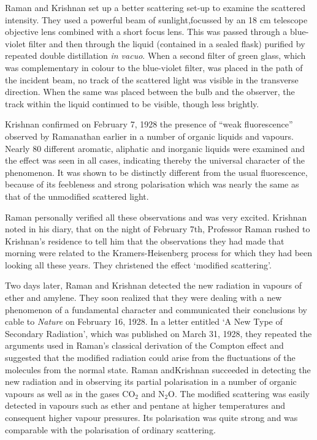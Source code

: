 Raman and Krishnan set up a better scattering set-up to
examine the scattered intensity. They used a powerful beam of
sunlight,\break focussed by an 18 cm telescope objective lens combined
with a short focus lens. This was passed through a blue-violet
filter and then through the liquid (contained in a sealed flask)
purified by repeated double distillation {\em in vacuo}. When a second
filter of green glass, which was complementary in colour to the
blue-violet filter, was placed in the path of the incident beam,
no track of the scattered light was visible in the transverse
direction. When the same was placed between the bulb and the
observer, the track within the liquid continued to be visible,
though less brightly.



Krishnan confirmed on February 7, 1928 the presence of
``weak fluorescence'' observed by Ramanathan earlier in a
number of organic liquids and vapours. Nearly 80 different
aromatic, aliphatic and inorganic liquids were examined and the
effect was seen in all cases, indicating thereby the universal
character of the phenomenon. It was shown to be distinctly
different from the usual fluorescence, because of its feebleness
and strong polarisation which was nearly the same as that of the
unmodified scattered light.

Raman personally verified all these observations and
was very excited. Krishnan noted in his diary, that on the night
of February 7th, Professor Raman rushed to Krishnan's residence
to tell him that the observations they had made that morning were
related to the Kramers-Heisenberg process for which they had
been looking all these years. They christened the effect `modified
scattering'.

Two days later, Raman and Krishnan detected the new
radiation in vapours of ether and amylene. They soon realized
that they were dealing with a new phenomenon of a fundamental
character and communicated their conclusions by cable to {\em Nature}
on February 16, 1928. In a letter entitled `A New Type of
Secondary Radiation', which was published on March 31, 1928,
they repeated the arguments used in Raman's classical derivation
of the Compton effect and suggested that the modified radiation
could arise from the fluctuations of the molecules from the normal
state. Raman and\break Krishnan succeeded in detecting the new
radiation and in observing its partial polarisation in a number
of organic vapours as well as in the gases CO$_2$ and N$_2$O.
The modified scattering was easily detected in vapours such as
ether and pentane at higher temperatures and consequent higher
vapour pressures. Its polarisation was quite strong and was
comparable with the polarisation of ordinary scattering.

